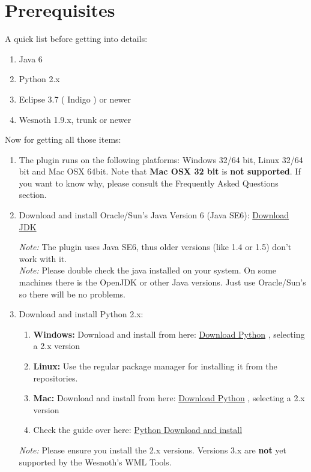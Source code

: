 \documentclass[10pt]{article}
\begin{document}
\section{Prerequisites}
A quick list before getting into details:
\begin{enumerate}
\item Java 6
\item Python 2.x
\item Eclipse 3.7 ( Indigo ) or newer
\item Wesnoth 1.9.x, trunk or newer
\end{enumerate}

Now for getting all those items:
\begin{enumerate}
\item The plugin runs on the following platforms: Windows 32/64 bit, Linux 32/64 bit and Mac OSX 64bit. Note that \textbf{Mac OSX 32 bit} is \textbf{not supported}. If you want to know why, please consult the Frequently Asked Questions section.
\item Download and install Oracle/Sun's Java Version 6 (Java SE6): \href{http://java.sun.com/javase/downloads/widget/jdk6.jsp}{Download JDK}

\textit{Note:} The plugin uses Java SE6, thus older versions (like 1.4 or 1.5) don't work with it.\\
\textit{Note:} Please double check the java installed on your system. On some machines there is the OpenJDK or other Java versions. Just use Oracle/Sun's so there will be no problems.

\item Download and install Python 2.x:
 \begin{enumerate}
   \item \textbf{Windows:} Download and install from here: \href{http://python.org/download/}{Download Python} , selecting a 2.x version
   \item \textbf{Linux:} Use the regular package manager for installing it from the repositories.
   \item \textbf{Mac:} Download and install from here: \href{http://python.org/download/}{Download Python} , selecting a 2.x version
   \item Check the guide over here: \href{http://wiki.python.org/moin/BeginnersGuide/Download}{Python Download and install}
  \end{enumerate}
 \textit{Note:} Please ensure you install the 2.x versions. Versions 3.x are \textbf{not} yet supported by the Wesnoth's WML Tools.


\end{enumerate}
\end{document}
